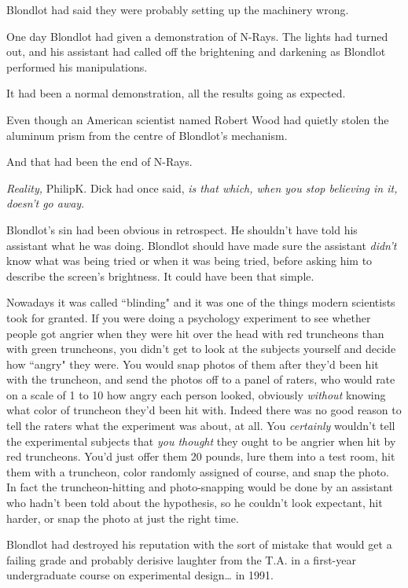 Blondlot had said they were probably setting up the machinery wrong.

One day Blondlot had given a demonstration of N-Rays. The lights had turned out, and his assistant had called off the brightening and darkening as Blondlot performed his manipulations.

It had been a normal demonstration, all the results going as expected.

Even though an American scientist named Robert Wood had quietly stolen the aluminum prism from the centre of Blondlot's mechanism.

And that had been the end of N-Rays.

\emph{Reality,} Philip\?K. Dick had once said, \emph{is that which, when you stop believing in it, doesn't go away}.

Blondlot's sin had been obvious in retrospect. He shouldn't have told his assistant what he was doing. Blondlot should have made sure the assistant \emph{didn't} know what was being tried or when it was being tried, before asking him to describe the screen's brightness. It could have been that simple.

Nowadays it was called ``blinding" and it was one of the things modern scientists took for granted. If you were doing a psychology experiment to see whether people got angrier when they were hit over the head with red truncheons than with green truncheons, you didn't get to look at the subjects yourself and decide how ``angry" they were. You would snap photos of them after they'd been hit with the truncheon, and send the photos off to a panel of raters, who would rate on a scale of 1 to 10 how angry each person looked, obviously \emph{without} knowing what color of truncheon they'd been hit with. Indeed there was no good reason to tell the raters what the experiment was about, at all. You \emph{certainly} wouldn't tell the experimental subjects that \emph{you thought} they ought to be angrier when hit by red truncheons. You'd just offer them 20 pounds, lure them into a test room, hit them with a truncheon, color randomly assigned of course, and snap the photo. In fact the truncheon-hitting and photo-snapping would be done by an assistant who hadn't been told about the hypothesis, so he couldn't look expectant, hit harder, or snap the photo at just the right time.

Blondlot had destroyed his reputation with the sort of mistake that would get a failing grade and probably derisive laughter from the T.A. in a first-year undergraduate course on experimental design{\ldots} in 1991.

